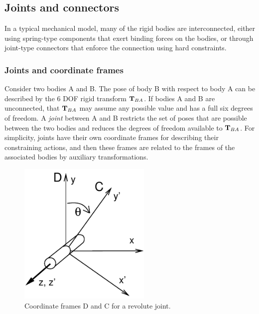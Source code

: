 \subsection{Joints and connectors}

In a typical mechanical model, many of the rigid bodies are
interconnected, either using spring-type components that exert binding
forces on the bodies, or through joint-type connectors that enforce
the connection using hard constraints.

\subsubsection{Joints and coordinate frames}

Consider two bodies A and B. The pose of body B with respect to body A
can be described by the 6 DOF rigid transform ${\bf T}_{BA}$.  If bodies A
and B are unconnected, that ${\bf T}_{BA}$ may assume any possible value
and has a full six degrees of freedom. A {\it joint} between A and B
restricts the set of poses that are possible between the two bodies
and reduces the degrees of freedom available to ${\bf T}_{BA}$.  For
simplicity, joints have their own coordinate frames for describing
their constraining actions, and then these frames are related to the
frames of the associated bodies by auxiliary transformations.

\begin{figure}[h]
\begin{center}
 \includegraphics[width=2.5in]{images/jointExample}
\end{center}
\caption{Coordinate frames D and C for a revolute joint.}
\label{jointExample:fig}
\end{figure}

